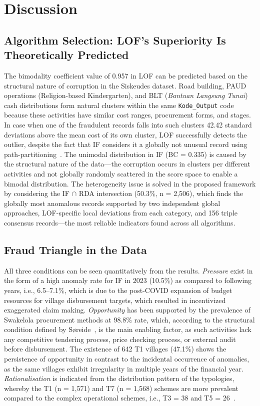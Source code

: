 \documentclass[3p,times,procedia]{elsarticle}
\begin{document}
\section{Discussion}
\label{sec:discussion}

\subsection{Algorithm Selection: LOF's Superiority Is Theoretically Predicted}

The bimodality coefficient value of 0.957 in LOF can be predicted based on the structural nature of corruption in the Siskeudes dataset. Road building, PAUD operations (Religion-based Kindergarten), and BLT (\textit{Bantuan Langsung Tunai}) cash distributions form natural clusters within the same \texttt{Kode\_Output} code because these activities have similar cost ranges, procurement forms, and stages. In case when one of the fraudulent records falls into such clusters 42.42 standard deviations above the mean cost of its own cluster, LOF successfully detects the outlier, despite the fact that IF considers it a globally not unusual record using path-partitioning~\cite{ref26}. The unimodal distribution in IF (BC = 0.335) is caused by the structural nature of the data—the corruption occurs in clusters per different activities and not globally randomly scattered in the score space to enable a bimodal distribution. The heterogeneity issue is solved in the proposed framework by considering the IF $\cap$ RDA intersection (50.3\%, n = 2,506), which finds the globally most anomalous records supported by two independent global approaches, LOF-specific local deviations from each category, and 156 triple consensus records—the most reliable indicators found across all algorithms.

\subsection{Fraud Triangle in the Data}

All three conditions can be seen quantitatively from the results. \textit{Pressure} exist in the form of a high anomaly rate for IF in 2023 (10.5\%) as compared to following years, i.e., 6.5–7.1\%, which is due to the post-COVID expansion of budget resources for village disbursement targets, which resulted in incentivized exaggerated claim making. \textit{Opportunity} has been supported by the prevalence of Swakelola procurement methods at 98.8\% rate, which, according to the structural condition defined by Søreide~\cite{ref22}, is the main enabling factor, as such activities lack any competitive tendering process, price checking process, or external audit before disbursement. The existence of 642 T1 villages (47.1\%) shows the persistence of opportunity in contrast to the incidental occurrence of anomalies, as the same villages exhibit irregularity in multiple years of the financial year. \textit{Rationalisation} is indicated from the distribution pattern of the typologies, whereby the T1 (n = 1,571) and T7 (n = 1,568) schemes are more prevalent compared to the complex operational schemes, i.e., T3 = 38 and T5 = 26~\cite{ref21}.
\end{document}
